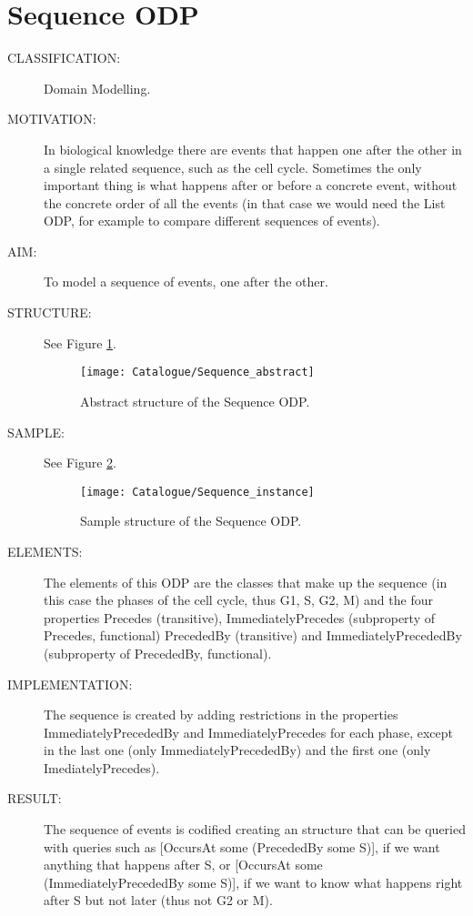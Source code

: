  \section{Sequence ODP}\begin{description}
\item [CLASSIFICATION:] Domain Modelling.

\item [MOTIVATION:] In biological knowledge there are events that happen one after the other in a single related sequence, such as the cell cycle. Sometimes the only important thing is what happens after or before a concrete event, without the concrete order of all the events (in that case we would need the List ODP, for example to compare different sequences of events).

\item [AIM:] To model a sequence of events, one after the other.

\item [STRUCTURE:] See Figure \ref{odp:Sequence_abstract}.
\begin{figure}[]\centering\texttt{[image: Catalogue/Sequence\_abstract]}\caption{\label{odp:Sequence_abstract} Abstract structure of the Sequence ODP.}\end{figure}

\item [SAMPLE:] See Figure \ref{odp:Sequence_instance}.
\begin{figure}[]\centering\texttt{[image: Catalogue/Sequence\_instance]}\caption{\label{odp:Sequence_instance} Sample structure of the Sequence ODP.}\end{figure}

\item [ELEMENTS:] The elements of this ODP are the classes that make up the sequence (in this case the phases of the cell cycle, thus G1, S, G2, M) and the four properties Precedes (transitive), ImmediatelyPrecedes (subproperty of Precedes, functional) PrecededBy (transitive) and ImmediatelyPrecededBy (subproperty of PrecededBy, functional).

\item [IMPLEMENTATION:] The sequence is created by adding restrictions in the properties ImmediatelyPrecededBy and ImmediatelyPrecedes for each phase, except in the last one (only ImmediatelyPrecededBy) and the first one (only ImediatelyPrecedes).

\item [RESULT:] The sequence of events is codified creating an structure that can be queried with queries such as [OccursAt some (PrecededBy some S)], if we want anything that happens after S, or [OccursAt some (ImmediatelyPrecededBy some S)], if we want to know what happens right after S but not later (thus not G2 or M).


\end{description}
